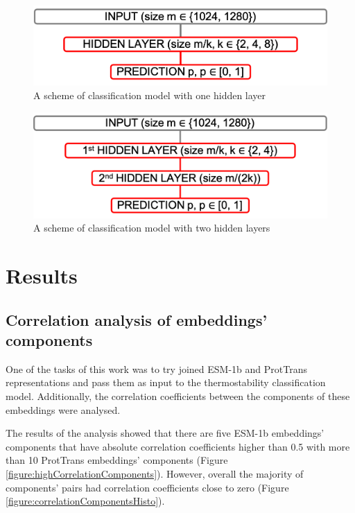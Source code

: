 \documentclass[12pt]{article}
\begin{document}
	\begin{figure}[h!]
		\centering
		\includegraphics[scale=0.6]{architecture_1hl.png}

		\caption{A scheme of classification model with one hidden layer}
		\label{figure:architecture1HL}
	\end{figure}

	\begin{figure}[h!]
		\centering
		\includegraphics[scale=0.6]{architecture_2hl.png}

		\caption{A scheme of classification model with two hidden layers}
		\label{figure:architecture2HL}
	\end{figure}

	\newpage

	\section{Results}

	\subsection{Correlation analysis of embeddings' components}

	One of the tasks of this work was to try joined ESM-1b and ProtTrans 
	representations and pass them as input to the thermostability 
	classification model. Additionally, the correlation 
	coefficients between the components of these embeddings were analysed. 

	The results of the analysis showed that there are five ESM-1b
	embeddings' components that have absolute correlation coefficients 
	higher than 0.5 with more than 10 ProtTrans embeddings' components  
	(Figure \ref{figure:highCorrelationComponents}). However, overall the 
	majority of components' pairs had correlation coefficients close to zero 
	(Figure \ref{figure:correlationComponentsHisto}).
\end{document}
